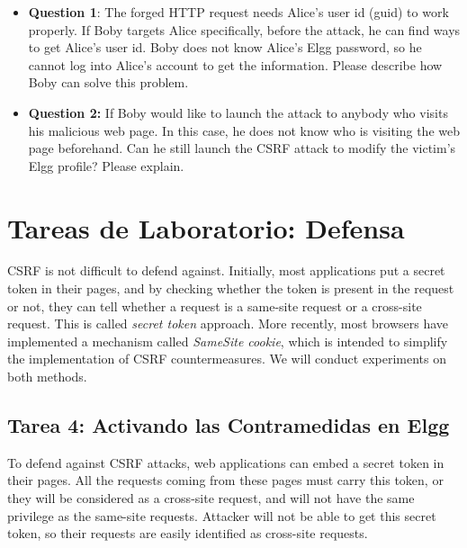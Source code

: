 \begin{itemize}
   \item \textbf{Question 1}: The forged HTTP request needs Alice's user
   id (guid) to work properly. If Boby targets Alice specifically, before
   the attack, he can find ways to get Alice's user id. Boby does not know 
   Alice's Elgg password, so he cannot log into Alice's account to get
   the information. Please describe how Boby can solve this problem.

   
   \item \textbf{Question 2:} If Boby would like to launch the attack to
   anybody who visits his malicious web page. In this case, he does not
   know who is visiting the web page beforehand. Can he still launch the CSRF attack
   to modify the victim's Elgg profile? Please explain.
\end{itemize}





\section{Tareas de Laboratorio: Defensa} 

CSRF is not difficult to defend against. Initially, most applications
put a secret token in their pages, and by checking whether the token
is present in the request or not, they can tell whether a request
is a same-site request or a cross-site request. This is called
\textit{secret token} approach. 
More recently,
most browsers have implemented a mechanism called 
\textit{SameSite cookie}, which is intended to simplify the 
implementation of CSRF countermeasures. We will 
conduct experiments on both methods. 


\subsection{Tarea 4: Activando las Contramedidas en Elgg} 

To defend against CSRF attacks, web applications can embed a secret token
in their pages. All the requests coming from these pages must carry this 
token, or they will be considered as a cross-site request, and will
not have the same privilege as the same-site requests. 
Attacker will not be able to get this secret token, so their requests
are easily identified as cross-site requests. 


